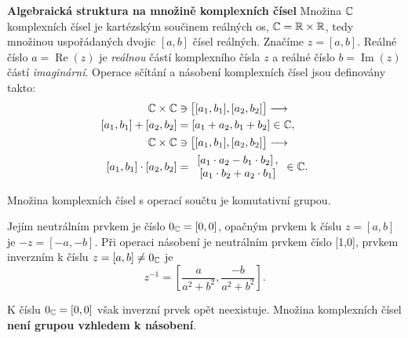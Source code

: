 \begin{mdframed}[style=mdexam]
  \begin{example}\label{mai:exam048}
    \textbf{Algebraická struktura na množině komplexních čísel}\newline
      Množina \(\mathbb{C}\) komplexních čísel je kartézským součinem reálných os, \(\mathbb{C} = 
      \mathbb{R} \times \mathbb{R}\), tedy množinou uspořádaných dvojic \([a, b]\) čísel reálných. 
      Značíme \(z = [a, b]\). Reálné číslo \(a = \operatorname{Re}(z)\) je \emph{reálnou} částí 
      komplexního čísla \(z\) a reálné číslo \(b = \operatorname{Im}(z)\) částí \emph{imaginární}. 
      Operace sčítání a násobení komplexních čísel jsou definovány takto:
      \begin{align*}
        \mathbb{C}\times\mathbb{C}      &\ni\left[[a_1, b_1],[a_2, b_2]\right] \longrightarrow   \\
          [a_1, b_1] + [a_2, b_2]     &= [a_1 + a_2, b_1 + b_2]\in\mathbb{C},                   \\
        \mathbb{C}\times\mathbb{C}      &\ni\left[[a_1, b_1],[a_2, b_2]\right] \longrightarrow   \\
          [a_1, b_1] \cdot [a_2, b_2] &= 
          \begin{array}{c}
            \left[a_1 \cdot a_2 - b_1 \cdot b_2\right], \\
            \left[a_1 \cdot b_2 + a_2 \cdot b_1\right]
          \end{array}
          \in\mathbb{C}.
      \end{align*}
      
      \begin{mdframed}[style=highlight]
        Množina komplexních čísel s operací součtu je komutativní grupou.
      \end{mdframed}
      
      Jejím neutrálním prvkem je číslo \(0_{\mathbb{C}} = [0,0]\), opačným prvkem k číslu \(z = [a, 
      b]\) je \(-z = [-a, - b]\). Při operaci násobení je neutrálním prvkem číslo [1,0], prvkem 
      inverzním k číslu \(z = [a, b] \neq 0_{\mathbb{C}}\) je
      \begin{equation*}
        z^{-1} = \left[\dfrac{a}{a^2 + b^2}, \dfrac{-b}{a^2 + b^2}\right].
      \end{equation*}
      
      K číslu \(0_{\mathbb{C}} = [0,0]\) však inverzní prvek opět neexistuje. Množina komplexních 
      čísel \textbf{není grupou vzhledem k násobení}.
  \end{example}
\end{mdframed}